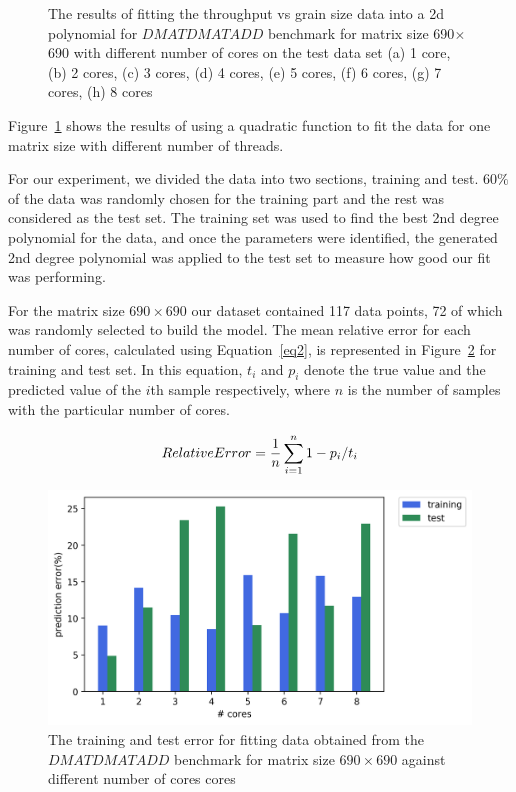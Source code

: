 \begin{figure}[H]
	\caption{The results of fitting the throughput vs grain size data into a 2d polynomial for $DMATDMATADD$ benchmark for matrix size 690$\times$690 with different number of cores on the test data set (a) 1 core, (b) 2 cores, (c) 3 cores, (d) 4 cores, (e) 5 cores, (f) 6 cores, (g) 7 cores, (h) 8 cores}	
	\label{fig10}
\end{figure}


\vspace{\baselineskip}	
Figure~\ref{fig10} shows the results of using a quadratic function to fit the data for one matrix size with different number of threads. 

For our experiment, we divided the data into two sections, training and test. $60\%$ of the data was randomly chosen for the training part and the rest was considered as the test set. The training set was used to find the best 2nd degree polynomial for the data, and once the parameters were identified, the generated 2nd degree polynomial was applied to the test set to measure how good our fit was performing. 

For the matrix size $690\times690$ our dataset contained 117 data points, 72 of which was randomly selected to build the model. The mean relative error for each number of cores, calculated using Equation~\ref{eq2}, is represented in Figure~\ref{fig11} for training and test set. In this equation, $t_i$ and $p_i$ denote the true value and the predicted value of the $i$th sample respectively, where $n$ is the number of samples with the particular number of cores. 

\begin{equation}{\label{eq2}}
Relative Error = \frac{1}{n}\sum_{i=1}^{n} {1-p_i/t_i}
\end{equation}

\vspace{\baselineskip}	
\begin{figure}[H]
	\centering
	\includegraphics[scale=.75]{images/polyfit/fig_train_test_690.png}
	\caption{The training and test error for fitting data obtained from the $DMATDMATADD$ benchmark for matrix size $690\times690$ against different number of cores cores}	
	\label{fig11}
\end{figure}

